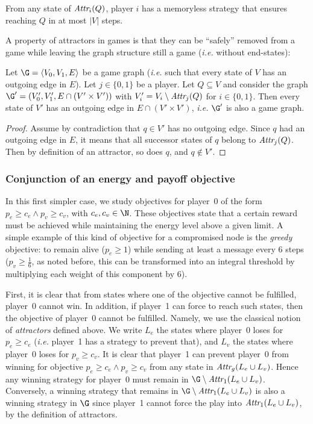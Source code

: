 \begin{lemma}
From any state of $\textit{Attr}_{i}(Q)$, player $i$ has a memoryless strategy that ensures reaching $Q$ in at most $|V|$ steps.
\end{lemma}

A property of attractors in games is that they can be ``safely'' removed from a game while leaving the graph structure still a game (\emph{i.e.} without end-states):
\begin{lemma}\label{tj:lem:removeattr}
Let $\G = \langle V_0, V_1, E\rangle$ be a game graph (\emph{i.e.} such that every state of $V$ has an outgoing edge in $E$).
Let $j \in \{0,1\}$ be a player.
Let $Q \subseteq V$ and consider the graph $\G' = (V_0', V_1', E \cap (V' \times V'))$ with $V_i' = V_i \setminus \textit{Attr}_{j}(Q)$ for $i \in \{0,1\}$.
Then every state of $V'$ has an outgoing edge in $E \cap (V' \times V')$, \emph{i.e.} $\G'$ is also a game graph.
\end{lemma}

\begin{proof}
Assume by contradiction that $q \in V'$ has no outgoing edge.
Since $q$ had an outgoing edge in $E$, it means that all successor states of $q$ belong to $\textit{Attr}_{j}(Q)$.
Then by definition of an attractor, so does $q$, and $q \notin V'$.
\end{proof}

\subsubsection{Conjunction of an energy and payoff objective}

In this first simpler case, we study objectives for player~0 of the form $p_e \geq c_e \wedge p_v \geq c_v$, with $c_e,c_v \in \N$.
These objectives state that a certain reward must be achieved while maintaining the energy level above a given limit.
A simple example of this kind of objective for a compromised node is the \emph{greedy} objective: to remain alive ($p_e \geq 1$) while sending at least a message every $6$ steps ($p_v \geq \frac1{6}$, as noted before, this can be transformed into an integral threshold by multiplying each weight of this component by $6$).

First, it is clear that from states where one of the objective cannot be fulfilled, player~0 cannot win.
In addition, if player~1 can force to reach such states, then the objective of player~0 cannot be fulfilled.
Namely, we use the classical notion of \emph{attractors} defined above.
We write $L_e$ the states where player~0 loses for $p_e \geq c_e$ (\emph{i.e.} player~1 has a strategy to prevent that), and $L_v$ the states where player~0 loses for $p_v \geq c_v$.
It is clear that player~1 can prevent player~0 from winning for objective $p_e \geq c_e \wedge p_v \geq c_v$ from any state in $\textit{Attr}_{g}(L_e \cup L_v)$.
Hence any winning strategy for player~0 must remain in $\G \setminus\attractor{1}(L_e \cup L_v)$.
Conversely, a winning strategy that remains in $\G \setminus\attractor{1}(L_e \cup L_v)$ is also a winning strategy in $\G$ since player~1 cannot force the play into $\textit{Attr}_{1}(L_e \cup L_v)$, by the definition of attractors.

